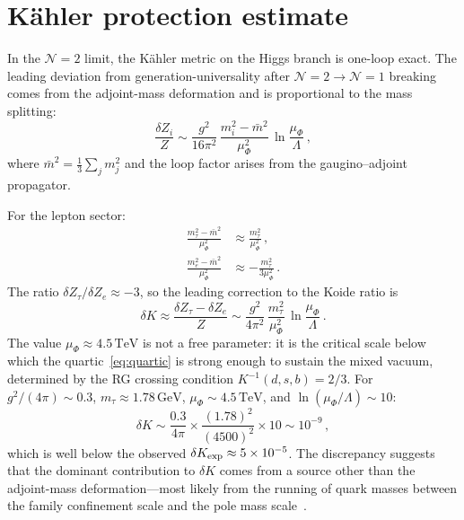 \documentclass[aps,prd,twocolumn,showpacs,preprintnumbers,superscriptaddress,floatfix]{revtex4-2}
\newcommand{\GeV}{\,\mathrm{GeV}}
\newcommand{\TeV}{\,\mathrm{TeV}}
\begin{document}
\section{K\"ahler protection estimate}
\label{app:kahler}

In the $\mathcal{N}{=}2$ limit, the K\"ahler metric on the Higgs
branch is one-loop exact.
The leading deviation from generation-universality after
$\mathcal{N}{=}2 \to \mathcal{N}{=}1$ breaking comes from the
adjoint-mass deformation and is proportional to the mass splitting:
\begin{equation}
  \frac{\delta Z_i}{Z}
  \sim \frac{g^2}{16\pi^2}\,
  \frac{m_i^2 - \bar{m}^2}{\mu_\Phi^2}\,
  \ln\frac{\mu_\Phi}{\Lambda}\,,
\end{equation}
where $\bar{m}^2 = \frac{1}{3}\sum_j m_j^2$ and the loop factor
arises from the gaugino--adjoint propagator.

For the lepton sector:
\begin{align}
  \frac{m_\tau^2 - \bar{m}^2}{\mu_\Phi^2}
  &\approx \frac{m_\tau^2}{\mu_\Phi^2}\,,\\
  \frac{m_e^2 - \bar{m}^2}{\mu_\Phi^2}
  &\approx -\frac{m_\tau^2}{3\mu_\Phi^2}\,.
\end{align}
The ratio $\delta Z_\tau / \delta Z_e \approx -3$, so the leading
correction to the Koide ratio is
\begin{equation}
  \delta K
  \approx \frac{\delta Z_\tau - \delta Z_e}{Z}
  \sim \frac{g^2}{4\pi^2}\,
  \frac{m_\tau^2}{\mu_\Phi^2}\,
  \ln\frac{\mu_\Phi}{\Lambda}\,.
  \label{eq:deltaK_estimate}
\end{equation}
The value $\mu_\Phi \approx 4.5\TeV$ is not a free parameter:
it is the critical scale below which the quartic~\eqref{eq:quartic}
is strong enough to sustain the mixed vacuum, determined by the
RG crossing condition $K^{-1}(d,s,b) = 2/3$.
For $g^2/(4\pi) \sim 0.3$, $m_\tau \approx 1.78\GeV$,
$\mu_\Phi \sim 4.5\TeV$, and $\ln(\mu_\Phi/\Lambda) \sim 10$:
\begin{equation}
  \delta K
  \sim \frac{0.3}{4\pi}\times
  \frac{(1.78)^2}{(4500)^2}\times 10
  \sim 10^{-9}\,,
\end{equation}
which is well below the observed
$\delta K_{\rm exp} \approx 5 \times 10^{-5}$.
The discrepancy suggests that the dominant contribution to
$\delta K$ comes from a source other than the adjoint-mass
deformation---most likely from the running of quark masses
between the family confinement scale and the pole mass
scale~\cite{Sumino:2009,MartinRobertson:2019}.
\end{document}
